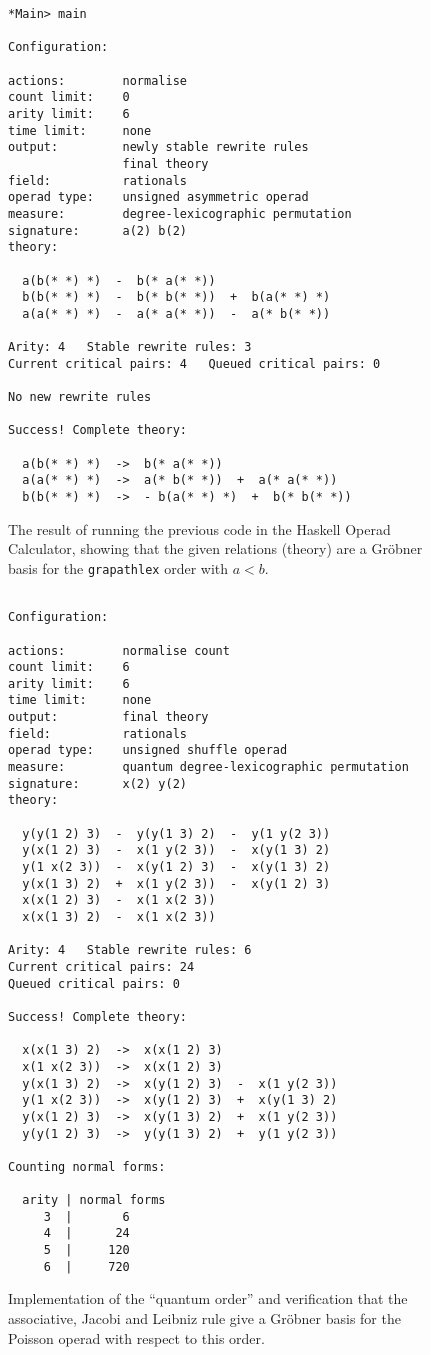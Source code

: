\documentclass[fleqn, a4paper, twoside]{article}
\newcommand{\0}{\langle 0\rangle}
\DeclareRobustCommand{\[}{\begin{equation}}%
\DeclareRobustCommand{\]}{\end{equation}}%
\theoremstyle{mytheorem}
\theoremstyle{introthm}
\theoremstyle{mydefinition}
\theoremstyle{mydefinition2}
\theoremstyle{plain} %
\newcommand{\?}{\,?\,}
\theoremstyle{mytheorem}
\theoremstyle{plain} %
\newcommand\blankpage{%
    \null
    \thispagestyle{empty}%
    \newpage}
\begin{document}
\begin{figure}
\begin{verbatim}
*Main> main

Configuration:

actions:        normalise 
count limit:    0
arity limit:    6
time limit:     none
output:         newly stable rewrite rules
                final theory
field:          rationals
operad type:    unsigned asymmetric operad
measure:        degree-lexicographic permutation 
signature:      a(2) b(2)
theory:

  a(b(* *) *)  -  b(* a(* *))
  b(b(* *) *)  -  b(* b(* *))  +  b(a(* *) *)
  a(a(* *) *)  -  a(* a(* *))  -  a(* b(* *))

Arity: 4   Stable rewrite rules: 3   
Current critical pairs: 4   Queued critical pairs: 0

No new rewrite rules

Success! Complete theory: 

  a(b(* *) *)  ->  b(* a(* *))
  a(a(* *) *)  ->  a(* b(* *))  +  a(* a(* *))
  b(b(* *) *)  ->  - b(a(* *) *)  +  b(* b(* *))
\end{verbatim}
\caption{The result of running the previous code in
the Haskell Operad Calculator, showing that the
given relations (theory) are a Gr\"obner basis for
the \texttt{grapathlex} order with $a<b$.}
\end{figure}


\begin{figure}

\begin{verbatim}

Configuration:

actions:        normalise count 
count limit:    6
arity limit:    6
time limit:     none
output:         final theory
field:          rationals
operad type:    unsigned shuffle operad
measure:        quantum degree-lexicographic permutation 
signature:      x(2) y(2)
theory:

  y(y(1 2) 3)  -  y(y(1 3) 2)  -  y(1 y(2 3))
  y(x(1 2) 3)  -  x(1 y(2 3))  -  x(y(1 3) 2)
  y(1 x(2 3))  -  x(y(1 2) 3)  -  x(y(1 3) 2)
  y(x(1 3) 2)  +  x(1 y(2 3))  -  x(y(1 2) 3)
  x(x(1 2) 3)  -  x(1 x(2 3))
  x(x(1 3) 2)  -  x(1 x(2 3))

Arity: 4   Stable rewrite rules: 6   
Current critical pairs: 24   
Queued critical pairs: 0

Success! Complete theory: 

  x(x(1 3) 2)  ->  x(x(1 2) 3)
  x(1 x(2 3))  ->  x(x(1 2) 3)
  y(x(1 3) 2)  ->  x(y(1 2) 3)  -  x(1 y(2 3))
  y(1 x(2 3))  ->  x(y(1 2) 3)  +  x(y(1 3) 2)
  y(x(1 2) 3)  ->  x(y(1 3) 2)  +  x(1 y(2 3))
  y(y(1 2) 3)  ->  y(y(1 3) 2)  +  y(1 y(2 3))

Counting normal forms:

  arity | normal forms
     3  |       6
     4  |      24
     5  |     120
     6  |     720
\end{verbatim}
\caption{Implementation of the ``quantum order'' and 
verification that the associative, Jacobi and 
Leibniz rule give a Gr\"obner basis for the
Poisson operad with respect to this order.}
\end{figure}
\afterpage{\blankpage}
\newpage
\end{document}
